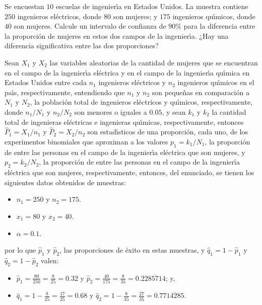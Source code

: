 \begin{enunciado}
 Se encuestan $10$ escuelas de ingenier\'{\i}a en Estados Unidos. La muestra contiene $250$ ingenieros el\'ectricos, donde $80$ son mujeres; y $175$ ingenieros qu\'{\i}micos, donde $40$ son mujeres. Calcule un intervalo de confianza de $90\%$ para la diferencia entre la proporci\'on de mujeres en estos dos campos de la ingenier\'{\i}a. ¿Hay una diferencia significativa entre las dos proporciones?
\end{enunciado}

\begin{solucion}
 Sean $X_1$ y $X_2$ las variables aleatorias de la cantidad de mujeres que se encuentran en el campo de la ingenier\'{\i}a el\'ectrica y en el campo de la ingenier\'{\i}a qu\'{\i}mica en Estados Unidos entre cada $n_1$ ingenieros el\'ectricos y $n_2$ ingenieros qu\'{\i}micos en el pa\'{\i}s, respectivamente, entendiendo que $n_1$ y $n_2$ son peque\~nas en comparaci\'on a $N_1$ y $N_2$, la poblaci\'on total de ingenieros el\'ectricos y qu\'{\i}micos, respectivamente, donde $n_1/N_1$ y $n_2/N_2$ son menores o iguales a $0.05$, y sean $k_1$ y $k_2$ la cantidad total de ingenieras el\'ectricas e ingenieras qu\'{\i}micas, respectivamente, entonces $\widehat{P}_1 = X_1/n_1$ y $\widehat{P}_2 = X_2/n_2$ son estad\'{\i}sticos de una proporci\'on, cada uno, de los experimentos binomiales que aproximan a los valores $p_1 = k_1/N_1$, la proporci\'on de entre las personas en el campo de la ingenier\'{\i}a el\'ectrica que son mujeres, y $p_2 = k_2/N_2$, la proporci\'on de entre las personas en el campo de la ingenier\'{\i}a el\'ectrica que son mujeres, respectivamente, entonces, del enunciado, se tienen los siguientes datos obtenidos de muestras:
 \begin{itemize}
  \item $n_1 = 250$ y $n_2 = 175$.
  \item $x_1 = 80$ y $x_2 = 40$.
  \item $\alpha = 0.1$.
 \end{itemize}
 por lo que $\hat{p}_1$ y $\hat{p}_2$, las proporciones de \'exito en estas muestras, y $\hat{q}_1 = 1 - \hat{p}_1$ y $\hat{q}_2 = 1 - \hat{p}_2$ valen:
 \begin{itemize}
  \item $\hat{p}_1 = \frac{80}{250} = \frac{8}{25} = 0.32$ y $\hat{p}_2 = \frac{40}{175} = \frac{8}{35} =   0.2\overline{285714}$; y,
  \item $\hat{q}_1 = 1 - \frac{8}{25} = \frac{17}{25} = 0.68$ y $\hat{q}_2 = 1 - \frac{8}{35} = \frac{27}{35} = 0.7\overline{714285}$.

\end{itemize}
\end{solucion}
